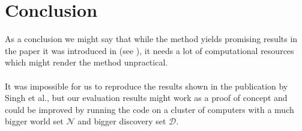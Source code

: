 \section{Conclusion}

As a conclusion we might say that while the method yields promising results in the paper it was introduced in 
(see \cite{Singh2012DiscPat}), it needs a lot of computational resources which might render the method unpractical.\\
\\
It was impossible for us to reproduce the results shown in the publication by Singh et al., but our evaluation results
might work as a proof of concept and could be improved by running the code on a cluster of computers with a much bigger
world set $\mathcal{N}$ and bigger discovery set $\mathcal{D}$.  